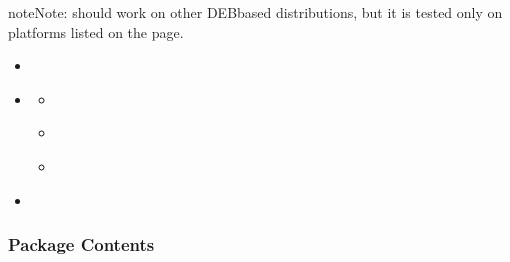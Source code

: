 \documentclass[letterpaper,10pt,english]{sphinxmanual}
\begin{document}
\begin{sphinxadmonition}{note}{Note:}
\sphinxAtStartPar
{} should work on other DEB\sphinxhyphen{}based distributions,
but it is tested only on platforms listed on the  page.
\end{sphinxadmonition}

\begin{sphinxShadowBox}
\begin{itemize}
\item {} 
\sphinxAtStartPar
{}\label{\detokenize{install/apt:id1}}{\hyperref[\detokenize{install/apt:package-contents}]{}}

\item {} 
\sphinxAtStartPar
{}\label{\detokenize{install/apt:id2}}{\hyperref[\detokenize{install/apt:installing-from-percona-repositories}]{}}
\begin{itemize}
\item {} 
\sphinxAtStartPar
{}\label{\detokenize{install/apt:id3}}{\hyperref[\detokenize{install/apt:configure-percona-repository}]{}}

\item {} 
\sphinxAtStartPar
{}\label{\detokenize{install/apt:id4}}{\hyperref[\detokenize{install/apt:install-the-latest-version}]{}}

\item {} 
\sphinxAtStartPar
{}\label{\detokenize{install/apt:id5}}{\hyperref[\detokenize{install/apt:install-a-specific-version}]{}}

\end{itemize}

\item {} 
\sphinxAtStartPar
{}\label{\detokenize{install/apt:id6}}{\hyperref[\detokenize{install/apt:running-percona-server-for-mongodb}]{}}

\end{itemize}
\end{sphinxShadowBox}


\subsubsection{Package Contents}
\label{\detokenize{install/apt:package-contents}}
\end{document}
